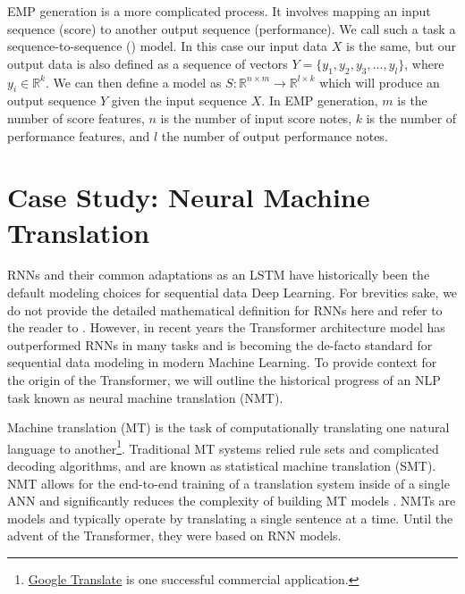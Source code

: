 EMP generation is a more complicated process. It involves mapping an input sequence (score) to another output sequence (performance). We call such a task a sequence-to-sequence (\seq{}) model. In this case our input data $X$ is the same, but our output data is also defined as a sequence of vectors $Y = \{y_1, y_2, y_3, ..., y_l\}$, where $y_i \in \mathbb{R}^k$. We can then define a \seq{} model as $S: \mathbb{R}^{n \times m} \rightarrow \mathbb{R}^{l \times k}$ which will produce an output sequence $Y$ given the input sequence $X$. In EMP generation, $m$ is the number of score features, $n$ is the number of input score notes, $k$ is the number of performance features, and $l$ the number of output performance notes. 

\section{Case Study: Neural Machine Translation}
RNNs and their common adaptations as an LSTM have historically been the default modeling choices for sequential data Deep Learning. For brevities sake, we do not provide the detailed mathematical definition for RNNs here and refer to the reader to \cite{goodfellow2016deep}. However, in recent years the Transformer\cite{vaswani2017attention} architecture model has outperformed RNNs in many tasks and is becoming the de-facto standard for sequential data modeling in modern Machine Learning. To provide context for the origin of the Transformer, we will outline the historical progress of an NLP task known as neural machine translation (NMT). 

Machine translation (MT) is the task of computationally translating one natural language to another\footnote{\href{https://translate.google.com/}{Google Translate} is one successful commercial application.}. Traditional MT systems relied rule sets and complicated decoding algorithms, and are known as statistical machine translation (SMT). NMT allows for the end-to-end training of a translation system inside of a single ANN and significantly reduces the complexity of building MT models \cite{chu2018survey}. NMTs are \seq{} models and typically operate by translating a single sentence at a time. Until the advent of the Transformer, they were based on RNN models. 

\newcommand{\ed}{\emph{encoder-decoder}}

